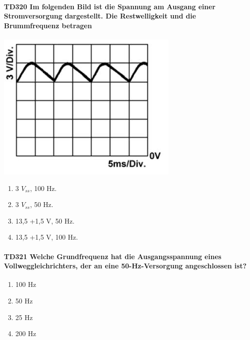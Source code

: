 \documentclass[8pt]{article}
\begin{document}
\begin{enumerate}
\begin{enumerate}[nolistsep,label=\Alph*]
\paragraph*{TD320 Im folgenden Bild ist die Spannung am Ausgang einer Stromversorgung dargestellt. Die Restwelligkeit und die Brummfrequenz betragen}
\begin{center}
	\begin{minipage}{\linewidth}
		\centering
		\includegraphics[scale=1.0]{pics/td320_a.jpg}
	\end{minipage}
\end{center}
\begin{enumerate}[nolistsep,label=\Alph*]
\item 3 $V_{ss}$, 100 Hz.
\item 3 $V_{ss}$, 50 Hz.
\item 13,5 +1,5 V, 50 Hz.
\item 13,5 +1,5 V, 100 Hz.
\end{enumerate}

\paragraph*{TD321 Welche Grundfrequenz hat die Ausgangsspannung eines Vollweggleichrichters, der an eine 50-Hz-Versorgung angeschlossen ist?}
\begin{enumerate}[nolistsep,label=\Alph*]
\item 100 Hz
\item 50 Hz
\item 25 Hz
\item 200 Hz
\end{enumerate}


\end{enumerate}
\end{enumerate}
\end{document}
